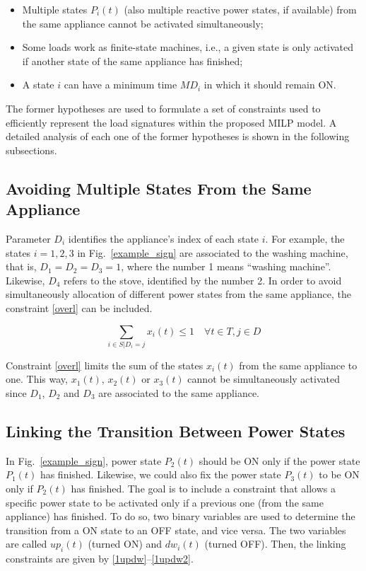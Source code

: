 \begin{itemize}

\item Multiple states $P_i(t)$ (also multiple reactive power states, if available) from the same appliance cannot be activated simultaneously;
\item Some loads work as finite-state machines, i.e., a given state is only activated if another state of the same appliance has finished;
\item A state $i$ can have a minimum time $MD_i$ in which it should remain ON.

\end{itemize}

The former hypotheses are used to formulate a set of constraints used to efficiently represent the load signatures within the proposed MILP model. A detailed analysis of each one of the former hypotheses is shown in the following subsections.

\subsection{Avoiding Multiple States From the Same Appliance}

Parameter $D_i$ identifies the appliance's index of each state $i$. For example, the states $i = 1, 2, 3$ in Fig.~\ref{example_sign} are associated to the washing machine, that is, $D_1 = D_2 = D_3 = 1$, where the number 1 means ``washing machine''. Likewise, $D_4$ refers to the stove, identified by the number 2. In order to avoid simultaneously allocation of different power states from the same appliance, the constraint \eqref{overl} can be included.

\begin{equation} \label{overl}
   \sum_{i \in S | D_{i} = j} x_i(t) \leq 1 \quad \forall t \in T, j \in D
\end{equation}

Constraint \eqref{overl} limits the sum of the states $x_i(t)$ from the same appliance to one. This way, $x_1(t)$, $x_2(t)$ or $x_3(t)$ cannot be simultaneously activated since $D_1$, $D_2$ and $D_3$ are associated to the same appliance.

\subsection{Linking the Transition Between Power States}

In Fig.~\ref{example_sign}, power state $P_2(t)$ should be ON only if the power state $P_1(t)$ has finished. Likewise, we could also fix the power state $P_3(t)$ to be ON only if $P_2(t)$ has finished. The goal is to include a constraint that allows a specific power state to be activated only if a previous one (from the same appliance) has finished. To do so, two binary variables are used to determine the transition from a ON state to an OFF state, and vice versa. The two variables are called $up_i(t)$ (turned ON) and $dw_i(t)$ (turned OFF). Then, the linking constraints are given by \eqref{1updw}--\eqref{1updw2}.
%

